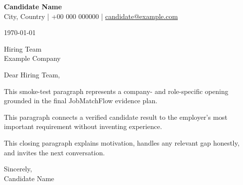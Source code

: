\documentclass[11pt,a4paper]{article}
\begin{document}
{\Large\bfseries Candidate Name}\\
City, Country \quad | \quad +00 000 000000 \quad | \quad
\href{mailto:candidate@example.com}{candidate@example.com}

\vspace{1.2em}
\today

\vspace{1.2em}
Hiring Team\\
Example Company

\vspace{1.2em}
Dear Hiring Team,

This smoke-test paragraph represents a company- and role-specific opening grounded in the final JobMatchFlow evidence plan.

This paragraph connects a verified candidate result to the employer's most important requirement without inventing experience.

This closing paragraph explains motivation, handles any relevant gap honestly, and invites the next conversation.

Sincerely,\\[1.2em]
Candidate Name
\end{document}
